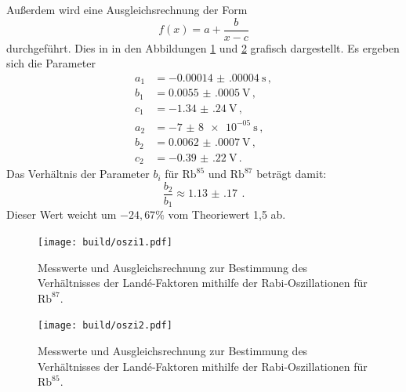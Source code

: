 Außerdem wird eine Ausgleichsrechnung der Form
\begin{equation*}
  f(x)=a+\frac{b}{x-c}
\end{equation*}
durchgeführt. Dies in in den Abbildungen \ref{fig:oszi1} und \ref{fig:oszi2} grafisch dargestellt.
Es ergeben sich die Parameter
\begin{align*}
  a_1&=\SI{-0.00014(00004)}{\second} \,,\\
  b_1&=\SI{0.0055(0005)}{\volt} \,,\\
  c_1&=\SI{-1.34(24)}{\volt} \,,\\
  a_2&=\SI{-7(8)e-05}{\second} \,,\\
  b_2&=\SI{0.0062(0007)}{\volt} \,,\\
  c_2&=\SI{-0.39(22)}{\volt} \,.
\end{align*}
Das Verhältnis der Parameter $b_i$ für $\text{Rb}^{85}$ und $\text{Rb}^{87}$ beträgt damit:
\begin{equation*}
  \frac{b_2}{b_1}\approx\SI{1.13(17)}{}\,.
\end{equation*}
Dieser Wert weicht um $-24{,}67\%$ vom Theoriewert 1{,}5 ab.
\begin{figure}
  \centering
  \texttt{[image: build/oszi1.pdf]}
  \caption{Messwerte und Ausgleichsrechnung zur Bestimmung des Verhältnisses der Landé-Faktoren mithilfe der
  Rabi-Oszillationen für $\text{Rb}^{87}$.}
  \label{fig:oszi1}
\end{figure}
\begin{figure}
  \centering
  \texttt{[image: build/oszi2.pdf]}
  \caption{Messwerte und Ausgleichsrechnung zur Bestimmung des Verhältnisses der Landé-Faktoren mithilfe der
  Rabi-Oszillationen für $\text{Rb}^{85}$.}
  \label{fig:oszi2}
\end{figure}
